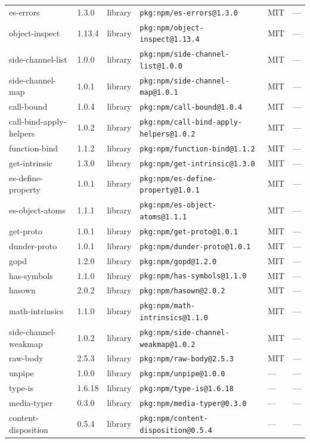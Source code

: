 \documentclass[11pt]{article}
\begin{document}
\begin{longtable}{|l|l|l|p{2.2cm}|l|p{4cm}|}
es-errors & 1.3.0 & library & \texttt{pkg:npm/es-errors@1.3.0} & MIT & — \\
object-inspect & 1.13.4 & library & \texttt{pkg:npm/object-inspect@1.13.4} & MIT & — \\
side-channel-list & 1.0.0 & library & \texttt{pkg:npm/side-channel-list@1.0.0} & MIT & — \\
side-channel-map & 1.0.1 & library & \texttt{pkg:npm/side-channel-map@1.0.1} & MIT & — \\
call-bound & 1.0.4 & library & \texttt{pkg:npm/call-bound@1.0.4} & MIT & — \\
call-bind-apply-helpers & 1.0.2 & library & \texttt{pkg:npm/call-bind-apply-helpers@1.0.2} & MIT & — \\
function-bind & 1.1.2 & library & \texttt{pkg:npm/function-bind@1.1.2} & MIT & — \\
get-intrinsic & 1.3.0 & library & \texttt{pkg:npm/get-intrinsic@1.3.0} & MIT & — \\
es-define-property & 1.0.1 & library & \texttt{pkg:npm/es-define-property@1.0.1} & MIT & — \\
es-object-atoms & 1.1.1 & library & \texttt{pkg:npm/es-object-atoms@1.1.1} & MIT & — \\
get-proto & 1.0.1 & library & \texttt{pkg:npm/get-proto@1.0.1} & MIT & — \\
dunder-proto & 1.0.1 & library & \texttt{pkg:npm/dunder-proto@1.0.1} & MIT & — \\
gopd & 1.2.0 & library & \texttt{pkg:npm/gopd@1.2.0} & MIT & — \\
has-symbols & 1.1.0 & library & \texttt{pkg:npm/has-symbols@1.1.0} & MIT & — \\
hasown & 2.0.2 & library & \texttt{pkg:npm/hasown@2.0.2} & MIT & — \\
math-intrinsics & 1.1.0 & library & \texttt{pkg:npm/math-intrinsics@1.1.0} & MIT & — \\
side-channel-weakmap & 1.0.2 & library & \texttt{pkg:npm/side-channel-weakmap@1.0.2} & MIT & — \\
raw-body & 2.5.3 & library & \texttt{pkg:npm/raw-body@2.5.3} & MIT & — \\
unpipe & 1.0.0 & library & \texttt{pkg:npm/unpipe@1.0.0} & — & — \\
type-is & 1.6.18 & library & \texttt{pkg:npm/type-is@1.6.18} & — & — \\
media-typer & 0.3.0 & library & \texttt{pkg:npm/media-typer@0.3.0} & — & — \\
content-disposition & 0.5.4 & library & \texttt{pkg:npm/content-disposition@0.5.4} & — & — \\

\end{longtable}
\end{document}
